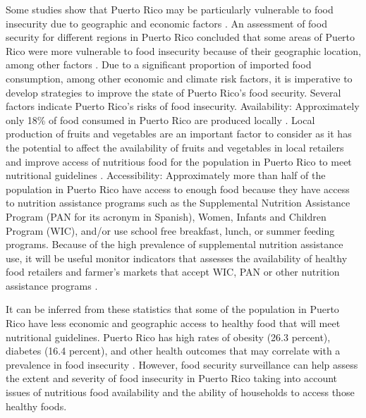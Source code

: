 \documentclass[12pt,letterpaper]{report}
\begin{document}
Some studies show that Puerto Rico may be particularly vulnerable to food insecurity due to geographic and economic factors \cite{prfsgeographic}. An assessment of food security for different regions in Puerto Rico concluded that some areas of Puerto Rico were more vulnerable to food insecurity because of their geographic location, among other factors \cite{prfsgeographic}. Due to a significant proportion of imported food consumption, among other economic and climate risk factors, it is imperative to develop strategies to improve the state of Puerto Rico's food security. Several factors indicate Puerto Rico's risks of food insecurity. Availability: Approximately only 18\% of food consumed in Puerto Rico are produced locally \cite{2010PRAgricultura}. Local production of fruits and vegetables are an important factor to consider as it has the potential to affect the availability of fruits and vegetables in local retailers and improve access of nutritious food for the population in Puerto Rico to meet nutritional guidelines \cite{story2008creating}. Accessibility: Approximately more than half of the population in Puerto Rico have access to enough food because they have access to nutrition assistance programs such as the Supplemental Nutrition Assistance Program (PAN for its acronym in Spanish), Women, Infants and Children Program (WIC), and/or use school free breakfast, lunch, or summer feeding programs. Because of the high prevalence of supplemental nutrition assistance use, it will be useful monitor indicators that assesses the availability of healthy food retailers and farmer's markets that accept WIC, PAN or other nutrition assistance programs \cite{story2008creating, fox2004effects, black2004special, dunifon2003influences, kendall1996relationship}.

It can be inferred from these statistics that some of the population in Puerto Rico have less economic and geographic access to healthy food that will meet nutritional guidelines. Puerto Rico has high rates of obesity (26.3 percent), diabetes (16.4 percent), and other health outcomes that may correlate with a prevalence in food insecurity \cite{martin2007food, seligman2007food}. However, food security surveillance can help assess the extent and severity of food insecurity in Puerto Rico taking into account issues of nutritious food availability and the ability of households to access those healthy foods.
\end{document}
